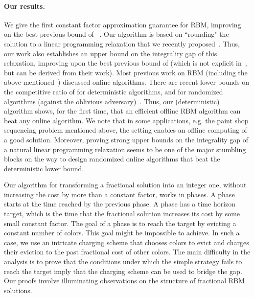 \documentclass[11pt]{article}
\begin{document}
\paragraph{Our results.}
We give the first constant factor approximation guarantee for RBM,
improving on the best previous bound of ~\cite{ACER11}.
Our algorithm is based on ``rounding" the solution to a linear programming
relaxation that we recently proposed~\cite{AR10}. Thus, our work also
establishes an  upper bound on the integrality gap of this
relaxation, improving upon the best previous bound of 
(which is not explicit in~\cite{ACER11}, but can be derived from their work).
Most previous work on RBM (including the above-mentioned~\cite{AR10,ACER11})
discussed online algorithms. There are recent lower bounds on the competitive
ratio of  for deterministic algorithms, and
 for randomized algorithms
(against the oblivious adversary)~\cite{ACER11}. Thus, our (deterministic) algorithm
shows, for the first time, that an efficient offline RBM algorithm can beat any online
algorithm. We note that in some applications, e.g. the paint shop sequencing
problem mentioned above, the setting enables an offline computing of a
good solution. Moreover, proving strong upper bounds on the integrality
gap of a natural linear programming relaxation seems to be one of the major
stumbling blocks on the way to design randomized online algorithms that
beat the deterministic lower bound.

Our algorithm for transforming a fractional solution into an integer one, without
increasing the cost by more than a constant factor, works in phases. A phase
starts at the time reached by the previous phase. A phase has a time horizon
target, which is the time that the fractional solution increases its cost by some
small constant factor. The goal of a phase is to reach the target by evicting a
constant number of colors. This goal might be impossible to achieve. In such
a case, we use an intricate charging scheme that chooses colors to evict and
charges their eviction to the past fractional cost of other colors. The main
difficulty in the analysis is to prove that the conditions under which the simple
strategy fails to reach the target imply that the charging scheme can be used
to bridge the gap. Our proofs involve illuminating observations on the structure
of fractional RBM solutions.
\end{document}
